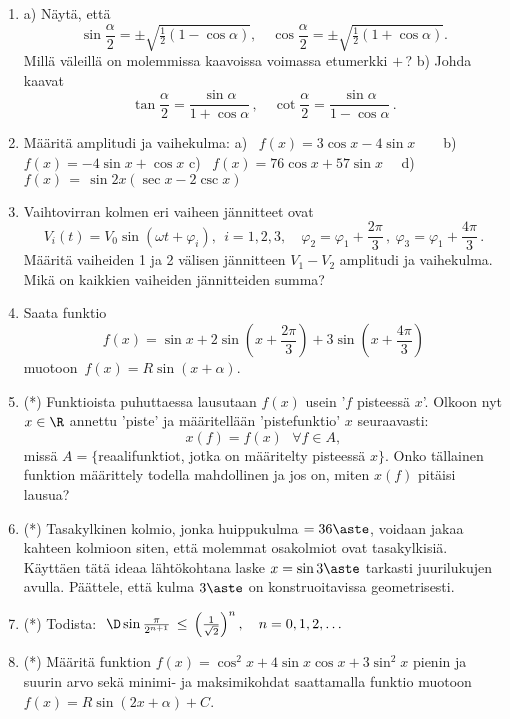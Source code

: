 \begin{enumerate}
\item \label{H-II-5: trigtuloksia}
a) Näytä, että
\[
\sin\frac{\alpha}{2}=\pm\sqrt{\tfrac{1}{2}(1-\cos\alpha)}, \quad
\cos\frac{\alpha}{2}=\pm\sqrt{\tfrac{1}{2}(1+\cos\alpha)}.
\]
Millä väleillä on molemmissa kaavoissa voimassa etumerkki $+$\,? \newline
b) Johda kaavat
\[
\tan \frac{\alpha}{2}=\frac{\sin \alpha}{1+\cos \alpha}\,, \quad
  \cot \frac{\alpha}{2}=\frac{\sin \alpha}{1-\cos \alpha}\,.
\]

\item
Määritä amplitudi ja vaihekulma: \newline
a) \ $f(x)=3\cos x-4\sin x \quad\ \ \ $ b) \ $f(x)=-4\sin x+\cos x$ \newline
c) \ $f(x)=76\cos x+57\sin x \quad$     d) \ $f(x)\,=\,\sin 2x(\sec x-2\csc x)$

\item
Vaihtovirran kolmen eri vaiheen jännitteet ovat
\[
V_i(t)=V_0\sin(\omega t+\varphi_i),\ \ i=1,2,3, \quad \varphi_2=\varphi_1 + \frac{2\pi}{3}\,,\
                                                      \varphi_3=\varphi_1 + \frac{4\pi}{3}\,.
\]
Määritä vaiheiden 1 ja 2 välisen jännitteen $V_1-V_2$ amplitudi ja vaihekulma. Mikä on 
kaikkien vaiheiden jännitteiden summa?

\item
Saata funktio
\[
f(x) = \sin x + 2\sin(x+\frac{2\pi}{3})+3\sin(x+\frac{4\pi}{3})
\]
muotoon $\,f(x)=R\sin(x+\alpha)$.

\item (*) 
Funktioista puhuttaessa lausutaan $f(x)$ usein '$f$ pisteessä $x$'. Olkoon nyt $x\in\R$ annettu
'piste' ja määritellään 'pistefunktio' $x$ seuraavasti:
\[
x(f)=f(x)\text{ }\forall f\in A,
\]
missä $A=\{$reaalifunktiot, jotka on määritelty pisteessä $x\}$. Onko tällainen 
funktion määrittely todella mahdollinen ja jos on, miten $x(f)$ pitäisi lausua?

\item (*) \label{H-II-5: geometrinen kulma}
Tasakylkinen kolmio, jonka huippukulma $=36\aste$, voidaan jakaa kahteen kolmioon siten, että
molemmat osakolmiot ovat tasakylkisiä. Käyttäen tätä ideaa lähtökohtana laske $x=\sin 3\aste$
tarkasti juurilukujen avulla. Päättele, että kulma $3\aste$ on konstruoitavissa geometrisesti.

\item (*) \label{H-II-5: sinin raja-arvo}
Todista: $\ {\D \sin\frac{\pi}{2^{n+1}} 
               \,\le\, \left(\frac{1}{\sqrt{2}}\right)^n, \quad n=0,1,2, \ldots}$ 

\item (*) \label{H-II-5: minmax}
Määritä funktion $f(x)=\cos^2 x+4\sin x\cos x+3\sin^2 x$ pienin ja suurin arvo sekä minimi-
ja maksimikohdat saattamalla funktio muotoon $f(x)=R\sin(2x+\alpha)+C$.

\end{enumerate}